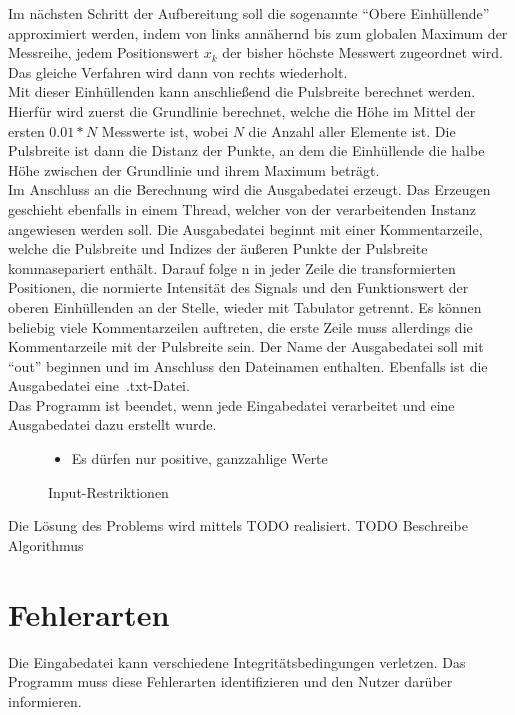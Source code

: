 Im nächsten Schritt der Aufbereitung soll die sogenannte \enquote{Obere Einhüllende} approximiert werden, indem von links annähernd bis zum globalen Maximum der Messreihe, jedem Positionswert $x_k$ der bisher höchste Messwert zugeordnet wird.
Das gleiche Verfahren wird dann von rechts wiederholt.\\
Mit dieser Einhüllenden kann anschließend die Pulsbreite berechnet werden.
Hierfür wird zuerst die Grundlinie berechnet, welche die Höhe im Mittel der ersten $0.01 * N$ Messwerte ist, wobei $N$ die Anzahl aller Elemente ist.
Die Pulsbreite ist dann die Distanz der Punkte, an dem die Einhüllende die halbe Höhe zwischen der Grundlinie und ihrem Maximum beträgt.\\

Im Anschluss an die Berechnung wird die Ausgabedatei erzeugt.
Das Erzeugen geschieht ebenfalls in einem Thread, welcher von der verarbeitenden Instanz angewiesen werden soll.
Die Ausgabedatei beginnt mit einer Kommentarzeile, welche die Pulsbreite und Indizes der äußeren Punkte der Pulsbreite kommasepariert enthält.
Darauf folge n in jeder Zeile die transformierten Positionen, die normierte Intensität des Signals und den Funktionswert der oberen Einhüllenden an der Stelle, wieder mit Tabulator getrennt.
Es können beliebig viele Kommentarzeilen auftreten, die erste Zeile muss allerdings die Kommentarzeile mit der Pulsbreite sein.
Der Name der Ausgabedatei soll mit \enquote{out} beginnen und im Anschluss den Dateinamen enthalten.
Ebenfalls ist die Ausgabedatei eine~.txt-Datei.\\
Das Programm ist beendet, wenn jede Eingabedatei verarbeitet und eine Ausgabedatei dazu erstellt wurde.

\begin{figure}[h]
    \centering
    \caption{Input-Restriktionen}
    \begin{itemize}[noitemsep]
        \item Es dürfen nur positive, ganzzahlige Werte
    \end{itemize}
    \label{fig:input-restrictions}
\end{figure}

Die Lösung des Problems wird mittels TODO realisiert. %
TODO Beschreibe Algorithmus %


\section{Fehlerarten}\label{sec:fehlerarten}
Die Eingabedatei kann verschiedene Integritätsbedingungen verletzen.
Das Programm muss diese Fehlerarten identifizieren und den Nutzer darüber informieren.

